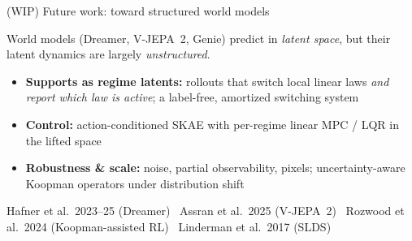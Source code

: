 \documentclass[aspectratio=169,10pt]{beamer}
\newcommand{\emphc}[1]{{\color{skaeorange}\bfseries #1}}
\newcommand{\emphp}[1]{{\color{skaepurple}\bfseries #1}}
\newcommand{\empht}[1]{{\color{skaeteal}\bfseries #1}}
\newenvironment{points}{\large\begin{itemize}\setlength{\itemsep}{0.85em}}{\end{itemize}}
\begin{document}

\begin{frame}{(WIP) Future work: toward structured world models}
  \begin{center}\normalsize
  World models (Dreamer, V-JEPA~2, Genie) predict in \emph{latent space}, but their latent dynamics are largely \emph{unstructured}.
  \end{center}
  \vspace{0.3em}
  \begin{points}
    \item \emphp{Supports as regime latents:} rollouts that switch local linear laws \emph{and report which law is active}; a label-free, amortized switching system
    \item \empht{Control:} action-conditioned SKAE with per-regime linear MPC / LQR in the lifted space
    \item \emphc{Robustness \& scale:} noise, partial observability, pixels; uncertainty-aware Koopman operators under distribution shift
  \end{points}
  \vspace{0.2em}
  \begin{center}\footnotesize\color{skaegray}
  Hafner et al.\ 2023--25 (Dreamer) \textperiodcentered\ Assran et al.\ 2025 (V-JEPA~2) \textperiodcentered\ Rozwood et al.\ 2024 (Koopman-assisted RL) \textperiodcentered\ Linderman et al.\ 2017 (SLDS)
  \end{center}
\end{frame}

\end{document}
